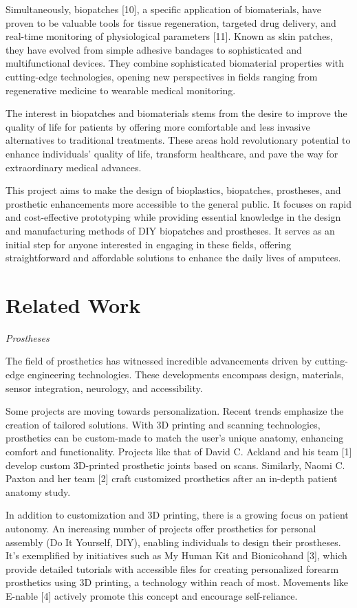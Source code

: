 Simultaneously, biopatches [10], a specific application of biomaterials, have proven to be valuable tools for tissue regeneration, targeted drug delivery, and real-time monitoring of physiological parameters [11]. Known as skin patches, they have evolved from simple adhesive bandages to sophisticated and multifunctional devices. They combine sophisticated biomaterial properties with cutting-edge technologies, opening new perspectives in fields ranging from regenerative medicine to wearable medical monitoring.

The interest in biopatches and biomaterials stems from the desire to improve the quality of life for patients by offering more comfortable and less invasive alternatives to traditional treatments. These areas hold revolutionary potential to enhance individuals' quality of life, transform healthcare, and pave the way for extraordinary medical advances.

This project aims to make the design of bioplastics, biopatches, prostheses, and prosthetic enhancements more accessible to the general public. It focuses on rapid and cost-effective prototyping while providing essential knowledge in the design and manufacturing methods of DIY biopatches and prostheses. It serves as an initial step for anyone interested in engaging in these fields, offering straightforward and affordable solutions to enhance the daily lives of amputees.

\section{Related Work}

\textit{Prostheses}

The field of prosthetics has witnessed incredible advancements driven by cutting-edge engineering technologies. These developments encompass design, materials, sensor integration, neurology, and accessibility.

Some projects are moving towards personalization. Recent trends emphasize the creation of tailored solutions. With 3D printing and scanning technologies, prosthetics can be custom-made to match the user's unique anatomy, enhancing comfort and functionality. Projects like that of David C. Ackland and his team [1] develop custom 3D-printed prosthetic joints based on scans. Similarly, Naomi C. Paxton and her team [2] craft customized prosthetics after an in-depth patient anatomy study.

In addition to customization and 3D printing, there is a growing focus on patient autonomy. An increasing number of projects offer prosthetics for personal assembly (Do It Yourself, DIY), enabling individuals to design their prostheses. It's exemplified by initiatives such as My Human Kit and Bionicohand [3], which provide detailed tutorials with accessible files for creating personalized forearm prosthetics using 3D printing, a technology within reach of most. Movements like E-nable [4] actively promote this concept and encourage self-reliance.

